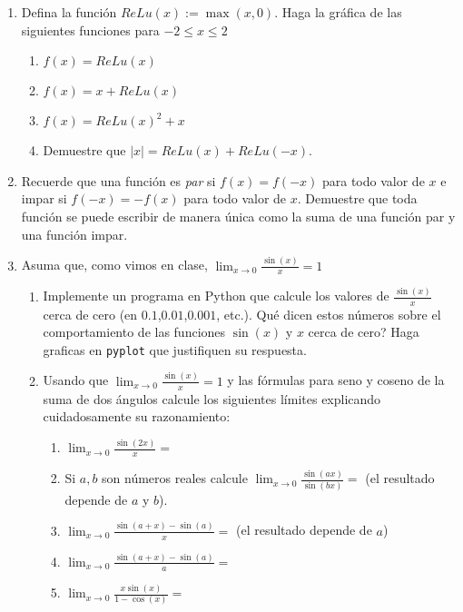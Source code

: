 \documentclass[12pt, a4paper]{article}
\begin{document}
\begin{enumerate}
\item Defina la función $ReLu(x):=\max(x,0)$. Haga la gráfica de las siguientes funciones para $-2\leq x\leq 2$
\begin{enumerate}
\item $f(x)=ReLu(x)$
\item $f(x)=x+ReLu(x)$
\item $f(x)=ReLu(x)^2+x$
\item Demuestre que $|x|=ReLu(x)+ReLu(-x)$.
\end{enumerate}

\item Recuerde que una función es \emph{par} si $f(x)=f(-x)$ para todo valor de $x$ e impar si $f(-x)=-f(x)$ para todo valor de $x$. Demuestre que toda función se puede escribir de manera única como la suma de una función par y una función impar.


\item Asuma que, como vimos en clase, $\lim_{x\rightarrow 0}\frac{\sin(x)}{x}=1$ 
\begin{enumerate}
\item Implemente un programa en Python que calcule los valores de $\frac{\sin(x)}{x}$ cerca de cero (en $0.1$,$0.01$,$0.001$, etc.). Qué dicen estos números sobre el comportamiento de las funciones $\sin(x)$ y $x$ cerca de cero? Haga graficas en \verb!pyplot! que justifiquen su respuesta.

\item Usando que $\lim_{x\rightarrow 0}\frac{\sin(x)}{x}=1$ y las fórmulas para seno y coseno de la suma de dos ángulos calcule los siguientes límites explicando cuidadosamente su razonamiento:

\begin{enumerate}
\item $\lim_{x\rightarrow 0} \frac{\sin(2x)}{x}=$ 
\item Si $a,b$ son números reales calcule $\lim_{x\rightarrow 0} \frac{\sin(ax)}{\sin(bx)}=$ (el resultado depende de $a$ y $b$).
\item $\lim_{x\rightarrow 0} \frac{\sin(a+x)-\sin(a)}{x}=$ (el resultado depende de $a$) 
\item $\lim_{x\rightarrow 0} \frac{\sin(a+x)-\sin(a)}{a}=$  
\item $\lim_{x\rightarrow 0} \frac{x\sin(x)}{1-\cos(x)}=$

\end{enumerate}

\end{enumerate}




\end{enumerate}
\end{document}
